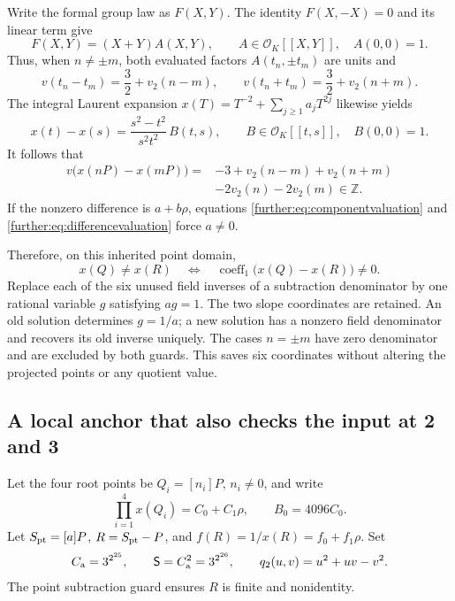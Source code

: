 Write the formal group law as $F(X,Y)$. The identity $F(X,-X)=0$ and
its linear term give
\[
 F(X,Y)=(X+Y)A(X,Y),\qquad
 A\in\mathcal O_K[[X,Y]],\quad A(0,0)=1.
\]
Thus, when $n\ne\pm m$, both evaluated factors $A(t_n,\pm t_m)$ are
units and
\[
 v(t_n-t_m)=\frac32+v_2(n-m),\qquad
 v(t_n+t_m)=\frac32+v_2(n+m).
\]
The integral Laurent expansion
$x(T)=T^{-2}+\sum_{j\ge1}a_jT^{2j}$ likewise yields
\[
 x(t)-x(s)=\frac{s^2-t^2}{s^2t^2}\,B(t,s),
 \qquad B\in\mathcal O_K[[t,s]],\quad B(0,0)=1.
\]
It follows that
\begin{equation}\label{further:eq:differencevaluation}
 \begin{split}
 v\bigl(x(nP)-x(mP)\bigr)
 ={}&-3+v_2(n-m)+v_2(n+m)\\
    &-2v_2(n)-2v_2(m)\in\mathbb Z.
 \end{split}
\end{equation}
If the nonzero difference is $a+b\rho$, equations
\eqref{further:eq:componentvaluation} and
\eqref{further:eq:differencevaluation} force $a\ne0$.

Therefore, on this inherited point domain,
\[
 x(Q)\ne x(R)
 \quad\Longleftrightarrow\quad
 \operatorname{coeff}_{1}\bigl(x(Q)-x(R)\bigr)\ne0.
\]
Replace each of the six unused field inverses of a subtraction denominator
by one rational variable $g$ satisfying $ag=1$.
The two slope coordinates are retained. An old solution determines
$g=1/a$; a new solution has a nonzero field denominator and recovers its
old inverse uniquely. The cases $n=\pm m$ have zero denominator and are
excluded by both guards. This saves six coordinates without altering the
projected points or any quotient value.

\subsection{A local anchor that also checks the input at 2 and 3}

Let the four root points be $Q_i=[n_i]P$, $n_i\ne0$, and write
\[
 \prod_{i=1}^{4}x(Q_i)=C_0+C_1\rho,
 \qquad B_0=4096C_0.
\]
Let $S_{\rm pt}=[a]P$, $R=S_{\rm pt}-P$, and
$f(R)=1/x(R)=f_0+f_1\rho$. Set
\[
 C_{\rm a}=3^{2^{25}},\qquad
 \mathsf S=C_{\rm a}^{2}=3^{2^{26}},\qquad
 q_2(u,v)=u^2+uv-v^2.
\]
The point subtraction guard ensures $R$ is finite and nonidentity.


